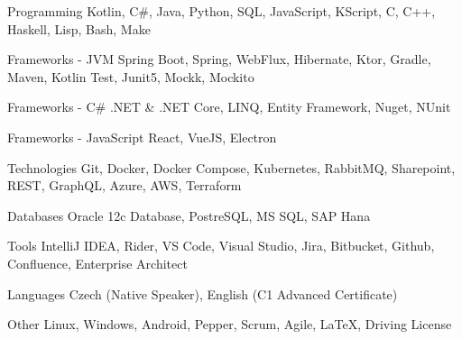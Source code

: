 
\begin{cvskills}

\cvskill
{Programming }
{Kotlin, C\#, Java, Python, SQL, JavaScript, KScript, C, C++, Haskell, Lisp, Bash, Make}

\cvskill
{Frameworks - JVM}
{Spring Boot, Spring, WebFlux, Hibernate, Ktor, Gradle, Maven, Kotlin Test, Junit5, Mockk, Mockito}

\cvskill
{Frameworks - C\#}
{.NET \& .NET Core, LINQ, Entity Framework, Nuget, NUnit}

\cvskill
{Frameworks - JavaScript}
{React, VueJS, Electron}

\cvskill
{Technologies}
{Git, Docker, Docker Compose, Kubernetes, RabbitMQ, Sharepoint, REST, GraphQL, Azure, AWS, Terraform}

\cvskill
{Databases}
{Oracle 12c Database, PostreSQL, MS SQL, SAP Hana}

\cvskill
{Tools}
{IntelliJ IDEA, Rider, VS Code, Visual Studio, Jira, Bitbucket, Github, Confluence, Enterprise Architect}

\cvskill
{Languages}
{Czech (Native Speaker), English (C1 Advanced Certificate)}

\cvskill
{Other}
{Linux, Windows, Android, Pepper, Scrum, Agile, LaTeX, Driving License}

\end{cvskills}